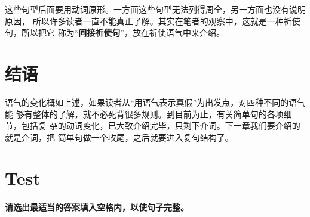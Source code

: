 这些句型后面要用动词原形。一方面这些句型无法列得周全，另一方面也没有说明原因，
所以许多读者一直不能真正了解。其实在笔者的观察中，这就是一种祈使句，所以把它
称为“\textbf{间接祈使句}”，放在祈使语气中来介绍。

\section{结语}

语气的变化概如上述，如果读者从“用语气表示真假”为出发点，对四种不同的语气能
够有整体的了解，就不必死背很多规则。到目前为止，有关简单句的各项细节，包括复
杂的动词变化，已大致介绍完毕，只剩下介词。下一章我们要介绍的就是介词，把
简单句做一个收尾，之后就要进入复句结构了。

\section{Test}

\paragraph{请选出最适当的答案填入空格内，以使句子完整。}

